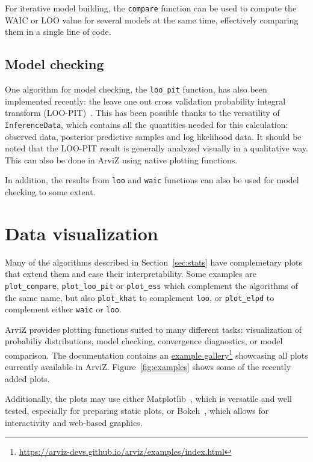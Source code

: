 \documentclass[anonymous=false, %
               format=acmsmall, %
               review=true, %
               screen=true, %
               nonacm=true]{acmart}
\begin{document}
For iterative model building, the \texttt{compare} function can be used
to compute the WAIC or LOO value for several
models at the same time, effectively comparing them in a single line of code.

\subsection{Model checking}
One algorithm for model checking, the \texttt{loo\_pit} function, has also been implemented
recently: the leave
one out cross validation probability integral transform
(LOO-PIT)~\cite{gabry2019visualization}. This has been possible thanks to the
versatility of \texttt{InferenceData}, which contains all the quantities
needed for this calculation: observed data, posterior predictive samples and
log likelihood data. It should be noted that the LOO-PIT result is generally
analyzed visually in a qualitative way. This can also be done in ArviZ using
native plotting functions.

In addition, the results from \texttt{loo} and
\texttt{waic} functions can also be used for model checking to some extent.

\section{Data visualization}\label{sec:plots}
Many of the algorithms described in Section~\ref{sec:stats} have complemetary
plots that extend them and ease their interpretability. Some
examples are \texttt{plot\_compare}, \texttt{plot\_loo\_pit} or
\texttt{plot\_ess} which complement the algorithms of the same name, but
also \texttt{plot\_khat} to complement \texttt{loo}, or
\texttt{plot\_elpd} to complement either \texttt{waic} or
\texttt{loo}.

ArviZ provides plotting functions suited to many different tasks:
visualization of probabiliy distributions, model checking, convergence
diagnostics, or model comparison. The
documentation contains an
\href{https://arviz-devs.github.io/arviz/examples/index.html}{example
gallery}\footnote{\url{https://arviz-devs.github.io/arviz/examples/index.html}}
showcasing all plots currently available in ArviZ. Figure~\ref{fig:examples}
shows some of the recently added plots.

Additionally, the plots may use either Matplotlib~\cite{Hunter2007matplotlib},
which is versatile and well
tested, especially for preparing static plots, or Bokeh~\cite{bokeh}, which allows for
interactivity and web-based graphics.
\end{document}
